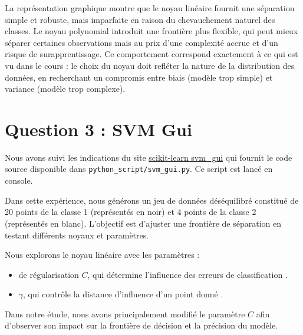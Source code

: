 \documentclass[12pt]{article}
\begin{document}
La représentation graphique montre que le noyau linéaire fournit une séparation simple et robuste, mais imparfaite en raison du chevauchement naturel des classes.
Le noyau polynomial introduit une frontière plus flexible, qui peut mieux séparer certaines observations mais au prix d’une complexité accrue et d’un risque de surapprentissage.
Ce comportement correspond exactement à ce qui est vu dans le cours : le choix du noyau doit refléter la nature de la distribution des données, en recherchant un compromis entre biais (modèle trop simple) et variance (modèle trop complexe).


\section{Question 3 : SVM Gui}
Nous avons suivi les indications du site 
\href{https://scikit-learn.org/1.2/auto_examples/applications/svm_gui.html}{scikit-learn svm\_gui} 
qui fournit le code source disponible dans \texttt{python\_script/svm\_gui.py}. 
Ce script est lancé en console.

Dans cette expérience, nous générons un jeu de données déséquilibré constitué 
de 20 points de la classe 1 (représentés en noir) et 4 points de la classe 2 
(représentés en blanc). L’objectif est d’ajuster une frontière de séparation en testant différents noyaux et paramètres.

Nous explorons le noyau linéaire avec les paramètres :
\begin{itemize}
    \item de régularisation $C$, qui détermine l’influence des erreurs de classification .
    \item $\gamma$, qui contrôle la distance d’influence d’un point donné .
\end{itemize}

Dans notre étude, nous avons principalement modifié le paramètre $C$ afin 
d’observer son impact sur la frontière de décision et la précision du modèle.
\end{document}

